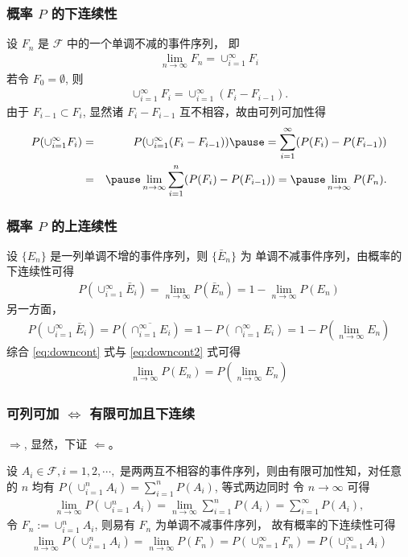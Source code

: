 \begin{frame}%
	\frametitle{概率 $P$ 的下连续性}


	设 $F_n$ 是 $\mathcal{F}$ 中的一个单调不减的事件序列，
	即
	\begin{eqnarray*}
		\lim_{n\rightarrow \infty}F_n=\cup_{i=1}^\infty F_i
	\end{eqnarray*}
	\pause 若令 $F_0=\emptyset$, 则
	\begin{eqnarray*}
		\cup_{i=1}^\infty F_i=\cup_{i=1}^\infty (F_i-F_{i-1}).
	\end{eqnarray*}
	\pause  由于 $F_{i-1}\subset F_i$, 显然诸 $F_i-F_{i-1}$ 互不相容，故由可列可加性得
	\begin{eqnarray*}
		P(\cup_{i=1}^\infty F_i)&=&P(\cup_{i=1}^\infty (F_i-F_{i-1}))\pause =\sum_{i=1}^\infty (P(F_i)-P(F_{i-1}))\\
		&=&\pause \lim_{n\rightarrow \infty}\sum_{i=1}^n(P(F_i)-P(F_{i-1}))=\pause \lim_{n\rightarrow \infty}P(F_n).
	\end{eqnarray*}
\end{frame}
\begin{frame}
	\frametitle{概率 $P$ 的上连续性}
	设 $\{E_n\}$ 是一列单调不增的事件序列，则 $\{\bar{E}_n\}$ 为
	单调不减事件序列，由概率的下连续性可得
	\begin{eqnarray}\label{eq:downcont}
		P(\cup_{i=1}^\infty \bar{E}_i)=\lim_{n\rightarrow\infty}P(\bar{E}_n)=1-\lim_{n\rightarrow\infty}P(E_n)
	\end{eqnarray}
	\pause 另一方面，
	\begin{eqnarray}
		\label{eq:downcont2}
		P(\cup_{i=1}^\infty \bar{E}_i)=P(\overline{\cap_{i=1}^\infty E_i})=1-P(\cap_{i=1}^\infty E_i)=1-P(\lim_{n\rightarrow\infty}E_n)
	\end{eqnarray}
	\pause 综合 \eqref{eq:downcont} 式与 \eqref{eq:downcont2} 式可得
	\begin{eqnarray*}
		\lim_{n\rightarrow\infty}P(E_n)=P(\lim_{n\rightarrow\infty}E_n)
	\end{eqnarray*}
\end{frame}
\begin{frame}
	\frametitle{可列可加 $\Leftrightarrow$ 有限可加且下连续}
	$\Rightarrow$, 显然，下证 $\Leftarrow$。\pause


	设 $A_i\in\mathcal{F},i=1,2,\cdots,$ 是两两互不相容的事件序列，则由有限可加性知，对任意的 $n$ 均有
	$P (\cup_{i=1}^nA_i)=\sum_{i=1}^nP (A_i)$, 等式两边同时
	令 $n\rightarrow\infty$ 可得
	\begin{eqnarray*}
		\lim_{n\rightarrow\infty} P(\cup_{i=1}^nA_i)=\lim_{n\rightarrow\infty}\sum_{i=1}^nP(A_i)=\sum_{i=1}^\infty P(A_i),
	\end{eqnarray*}
	\pause   令 $F_n:=\cup_{i=1}^nA_i$, 则易有 $F_n$ 为单调不减事件序列，
	故有概率的下连续性可得
	\begin{eqnarray*}
		\lim_{n\rightarrow\infty} P(\cup_{i=1}^nA_i)= \lim_{n\rightarrow\infty} P(F_n)=P(\cup_{n=1}^\infty F_n)=P(\cup_{i=1}^\infty A_i)
	\end{eqnarray*}


\end{frame}
